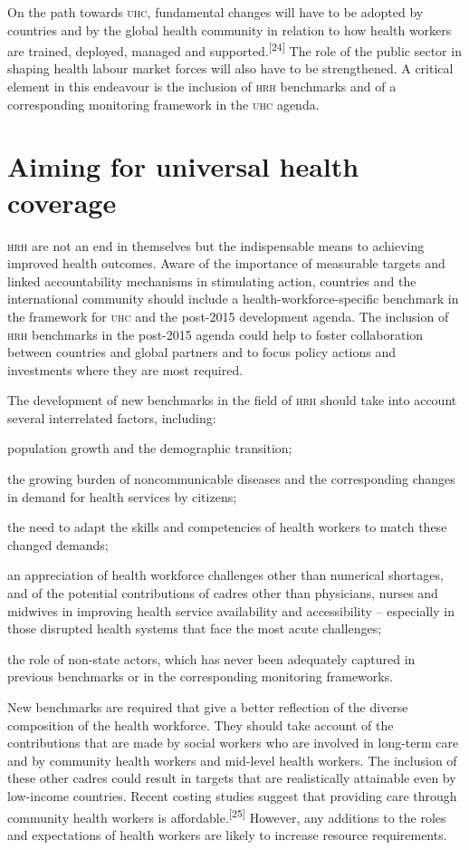 \documentclass{article}
\begin{document}
On the path towards \textsc{uhc}, fundamental changes will have to be adopted by
countries and by the
global health community in relation to how health workers are trained, deployed,
managed and
supported.\textsuperscript{[}\textsuperscript{24}\textsuperscript{]}
The role of the public sector in
shaping health labour market forces will also have to be strengthened. A
critical element in this
endeavour is the inclusion of \textsc{hrh} benchmarks and of a corresponding monitoring
framework in the \textsc{uhc}
agenda.

\section{Aiming for universal health coverage}

\textsc{hrh} are not an end in themselves but the indispensable means to achieving
improved health
outcomes. Aware of the importance of measurable targets and linked
accountability mechanisms in
stimulating action, countries and the international community should include a
health-workforce-specific benchmark in the framework for \textsc{uhc} and the post-2015
development agenda.
The inclusion of \textsc{hrh} benchmarks in the post-2015 agenda could help to foster
collaboration between
countries and global partners and to focus policy actions and investments where
they are most
required.

The development of new benchmarks in the field of \textsc{hrh} should take into account
several
interrelated factors, including:

population growth and the demographic transition;

the growing burden of noncommunicable diseases and the corresponding changes in
demand for health
services by citizens;

the need to adapt the skills and competencies of health workers to match these
changed
demands;

an appreciation of health workforce challenges other than numerical shortages,
and of the
potential contributions of cadres other than physicians, nurses and midwives in
improving health
service availability and accessibility – especially in those disrupted health
systems that
face the most acute challenges;

the role of non-state actors, which has never been adequately captured in
previous benchmarks or
in the corresponding monitoring frameworks.

New benchmarks are required that give a better reflection of the diverse
composition of the
health workforce. They should take account of the contributions that are made by
social workers who
are involved in long-term care and by community health workers and mid-level
health workers. The
inclusion of these other cadres could result in targets that are realistically
attainable even by
low-income countries. Recent costing studies suggest that providing care through
community health
workers is affordable.\textsuperscript{[}\textsuperscript{25}\textsuperscript{]}
However, any additions to
the roles and expectations of health workers are likely to increase resource
requirements.
\end{document}
